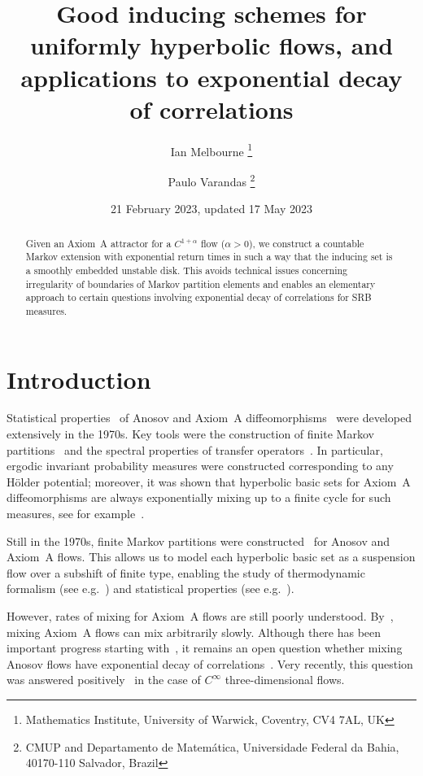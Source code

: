 \documentclass[12pt]{article}
\title{Good inducing schemes for uniformly hyperbolic flows,
and applications to exponential decay of correlations}
\author{
Ian Melbourne \thanks{Mathematics Institute, University of Warwick, Coventry, CV4 7AL, UK}
\and 
Paulo Varandas \thanks{CMUP and Departamento de Matem\'atica, Universidade Federal da Bahia, 40170-110 Salvador, Brazil}
}
\date{21 February 2023, updated 17 May 2023}
\numberwithin{equation}{section}
\begin{document}
 \maketitle

 \begin{abstract}
Given an Axiom~A attractor for a $C^{1+\alpha}$ flow ($\alpha>0$), we construct a countable Markov extension with exponential return times in such a way that the inducing set is a smoothly embedded unstable disk. This avoids technical issues concerning irregularity of boundaries of Markov partition elements and enables an elementary approach to certain questions involving exponential decay of correlations for SRB measures.
 \end{abstract}

 \section{Introduction} 
 \label{sec:intro}

Statistical properties~\cite{Bowen75,Ruelle78,Sinai72} of Anosov and Axiom~A diffeomorphisms~\cite{Anosov67,Smale67} were developed extensively in the 1970s.
Key tools were the construction of finite Markov partitions~\cite{Bowen70,Sinai68}
and the spectral properties of transfer operators~\cite{Ruelle68}.
In particular, ergodic invariant probability measures were constructed corresponding to any H\"older potential; moreover, it was shown that hyperbolic basic sets for Axiom~A diffeomorphisms are always exponentially mixing up to a finite cycle for such measures, see for example~\cite{Bowen75,ParryPollicott90,Ruelle78}.

Still in the 1970s, finite Markov partitions were constructed~\cite{Bowen73,Ratner73b} 
for Anosov and Axiom~A flows. This allows us to model each hyperbolic basic set as a suspension flow over a subshift of finite type, enabling the study of thermodynamic formalism (see e.g.~\cite{BowenRuelle75}) and statistical properties 
(see e.g.~\cite{DenkerPhilipp84,Ratner73}).

However, rates of mixing for Axiom~A flows are still poorly understood. 
By~\cite{Pollicott84,Ruelle83}, mixing Axiom~A flows can mix arbitrarily 
slowly. 
Although there has been important progress starting with~\cite{Chernov98,Dolgopyat98a,Liverani04},
it remains an open question whether mixing Anosov flows have exponential decay of correlations~\cite{BowenRuelle75}. 
Very recently, this question was answered positively~\cite{TsujiiZhang23} in the case of $C^\infty$ three-dimensional flows.
\end{document}
